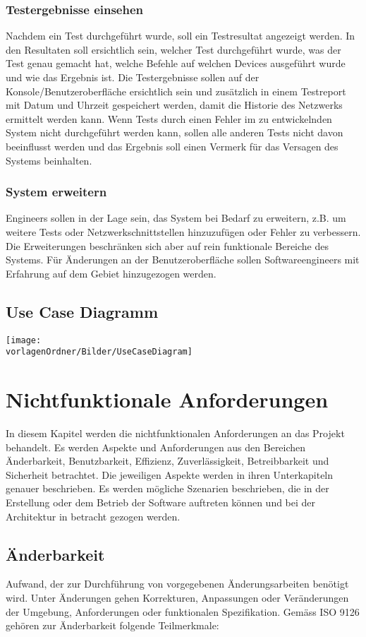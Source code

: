 \documentclass[
	ngerman,
	toc=listof, %
	toc=bibliography, %
	footnotes=multiple, %
	parskip=half, %
	numbers=noendperiod %
]{scrartcl}
\newcommand{\vorlagenOrdner}{../../99_Vorlagen} %
\begin{document}
		\subsubsection{Testergebnisse einsehen}
			Nachdem ein Test durchgeführt wurde, soll ein Testresultat angezeigt werden.
			In den Resultaten soll ersichtlich sein, welcher Test durchgeführt wurde, was der Test genau gemacht hat, welche Befehle auf welchen Devices ausgeführt wurde und wie das Ergebnis ist.
			Die Testergebnisse sollen auf der Konsole/Benutzeroberfläche ersichtlich sein und zusätzlich in einem Testreport mit Datum und Uhrzeit gespeichert werden, damit die Historie des Netzwerks ermittelt werden kann.
			Wenn Tests durch einen Fehler im zu entwickelnden System nicht durchgeführt werden kann, sollen alle anderen Tests nicht davon beeinflusst werden und das Ergebnis soll einen Vermerk für das Versagen des Systems beinhalten.
	
		\subsubsection{System erweitern}
			Engineers sollen in der Lage sein, das System bei Bedarf zu erweitern, z.B. um weitere Tests oder Netzwerkschnittstellen hinzuzufügen oder Fehler zu verbessern.
			Die Erweiterungen beschränken sich aber auf rein funktionale Bereiche des Systems. Für Änderungen an der Benutzeroberfläche sollen Softwareengineers mit Erfahrung auf dem Gebiet hinzugezogen werden.
			 
			
	\subsection{Use Case Diagramm}
		\texttt{[image: \\vorlagenOrdner/Bilder/UseCaseDiagram]}

\section{Nichtfunktionale Anforderungen}
	In diesem Kapitel werden die nichtfunktionalen Anforderungen an das Projekt behandelt.
	Es werden Aspekte und Anforderungen aus den Bereichen Änderbarkeit, Benutzbarkeit, Effizienz, Zuverlässigkeit, Betreibbarkeit und Sicherheit betrachtet.
	Die jeweiligen Aspekte werden in ihren Unterkapiteln genauer beschrieben.
	Es werden mögliche Szenarien beschrieben, die in der Erstellung oder dem Betrieb der Software auftreten können und bei der Architektur in betracht gezogen werden.

	\subsection{Änderbarkeit}
		Aufwand, der zur Durchführung von vorgegebenen Änderungsarbeiten benötigt wird.
		Unter Änderungen gehen Korrekturen, Anpassungen oder Veränderungen der Umgebung, Anforderungen oder funktionalen Spezifikation.
		Gemäss ISO 9126 gehören zur Änderbarkeit folgende Teilmerkmale:
		
\end{document}
